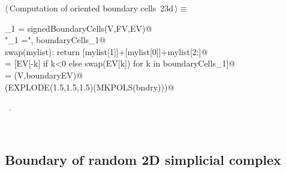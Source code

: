 \documentclass[11pt,oneside]{article}	%
\begin{document}
\begin{flushleft} \small
\begin{minipage}{\linewidth} \label{scrap58}
\protect{}$\langle\,$Computation of oriented boundary cells\nobreak\ {\footnotesize 23d}$\,\rangle\equiv$
\vspace{-1ex}
\begin{list}{}{} \item
\mbox{}\verb@boundaryCells_1 = signedBoundaryCells(V,FV,EV)@\\
\mbox{}\verb@print "\nboundaryCells_1 =\n", boundaryCells_1@\\
\mbox{}\verb@def swap(mylist): return [mylist[1]]+[mylist[0]]+mylist[2:]@\\
\mbox{}\verb@boundaryEV = [EV[-k] if k<0 else swap(EV[k]) for k in boundaryCells_1]@\\
\mbox{}\verb@bndry = (V,boundaryEV)@\\
\mbox{}\verb@VIEW(EXPLODE(1.5,1.5,1.5)(MKPOLS(bndry)))@\\
\mbox{}\verb@@{\NWsep}
\end{list}
\vspace{-1ex}
\footnotesize\addtolength{\baselineskip}{-1ex}
\begin{list}{}{\setlength{\itemsep}{-\parsep}\setlength{\itemindent}{-\leftmargin}}
\item \NWtxtMacroRefIn\ .
\end{list}
\end{minipage}\\[4ex]
\end{flushleft}

\subsection{Boundary of random 2D simplicial complex}
\end{document}
